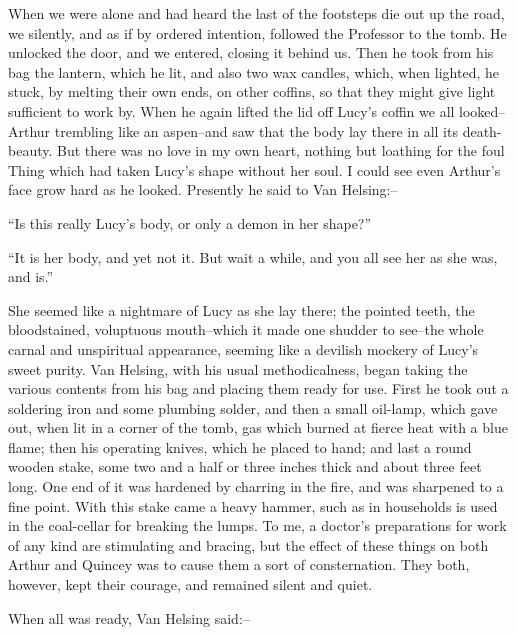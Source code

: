 \documentclass[12pt,openright]{book}
\begin{document}
When we were alone and had heard the last of the footsteps die out up the road, we silently, and as if by ordered intention, followed the Professor to the tomb. He unlocked the door, and we entered, closing it behind us. Then he took from his bag the lantern, which he lit, and also two wax candles, which, when lighted, he stuck, by melting their own ends, on other coffins, so that they might give light sufficient to work by. When he again lifted the lid off Lucy’s coffin we all looked–Arthur trembling like an aspen–and saw that the body lay there in all its death-beauty. But there was no love in my own heart, nothing but loathing for the foul Thing which had taken Lucy’s shape without her soul. I could see even Arthur’s face grow hard as he looked. Presently he said to Van Helsing:–

“Is this really Lucy’s body, or only a demon in her shape?”

“It is her body, and yet not it. But wait a while, and you all see her as she was, and is.”

She seemed like a nightmare of Lucy as she lay there; the pointed teeth, the bloodstained, voluptuous mouth–which it made one shudder to see–the whole carnal and unspiritual appearance, seeming like a devilish mockery of Lucy’s sweet purity. Van Helsing, with his usual methodicalness, began taking the various contents from his bag and placing them ready for use. First he took out a soldering iron and some plumbing solder, and then a small oil-lamp, which gave out, when lit in a corner of the tomb, gas which burned at fierce heat with a blue flame; then his operating knives, which he placed to hand; and last a round wooden stake, some two and a half or three inches thick and about three feet long. One end of it was hardened by charring in the fire, and was sharpened to a fine point. With this stake came a heavy hammer, such as in households is used in the coal-cellar for breaking the lumps. To me, a doctor’s preparations for work of any kind are stimulating and bracing, but the effect of these things on both Arthur and Quincey was to cause them a sort of consternation. They both, however, kept their courage, and remained silent and quiet.

When all was ready, Van Helsing said:–
\end{document}
